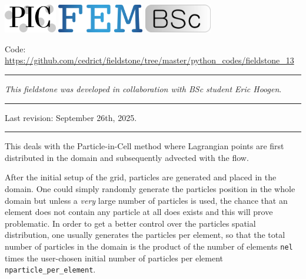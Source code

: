 \includegraphics[height=1.25cm]{images/pictograms/pic}
\includegraphics[height=1.25cm]{images/pictograms/FEM}
\includegraphics[height=1.25cm]{images/pictograms/bsc}


%

\begin{center}
\inpython 
{\small Code: \url{https://github.com/cedrict/fieldstone/tree/master/python_codes/fieldstone_13}}
\end{center}

\par\noindent\rule{\textwidth}{0.4pt}

{\sl This fieldstone was developed in collaboration with BSc student Eric Hoogen}. 

\par\noindent\rule{\textwidth}{0.4pt}

Last revision: September 26th, 2025.

\par\noindent\rule{\textwidth}{0.4pt}


This \stone deals with the Particle-in-Cell method where 
Lagrangian points are first distributed in the domain and 
subsequently advected with the flow.

After the initial setup of the grid, particles are
generated and placed in the domain. One could simply randomly generate 
the particles position in the whole domain but unless a {\it very} large 
number of particles is used, the chance that an element does 
not contain any particle at all does exists and this will prove problematic. 
In order to get a better control over the particles spatial distribution, 
one usually generates the particles per element, so that the total 
number of particles in the domain is the product of the number of 
elements \lstinline{nel} times the user-chosen initial number of particles 
per element \lstinline{nparticle_per_element}.

